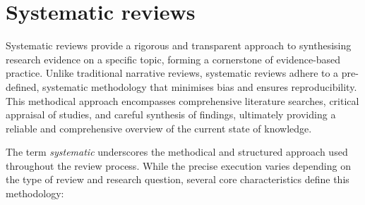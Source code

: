 \documentclass{article}
\begin{document}
\section{Systematic reviews}

Systematic reviews provide a rigorous and transparent approach to synthesising research evidence on a specific topic, forming a cornerstone of evidence-based practice. Unlike traditional narrative reviews, systematic reviews adhere to a pre-defined, systematic methodology that minimises bias and ensures reproducibility. This methodical approach encompasses comprehensive literature searches, critical appraisal of studies, and careful synthesis of findings, ultimately providing a reliable and comprehensive overview of the current state of knowledge.

The term \emph{systematic} underscores the methodical and structured approach used throughout the review process. While the precise execution varies depending on the type of review and research question, several core characteristics define this methodology:
\end{document}
